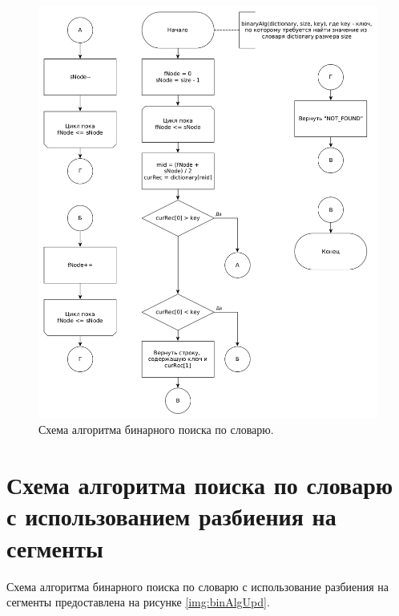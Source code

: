 \documentclass[12pt]{report}
\begin{document}
\begin{figure}
\begin{center}
\includegraphics[scale=0.4]{inc/img/binAlg.png}
\captionsetup{justification=centering}
	\caption{Схема алгоритма бинарного поиска по словарю.}
	\label{img:binAlg}	
\end{center}
\end{figure}

\section{Схема алгоритма поиска по словарю с использованием разбиения на сегменты}
Схема алгоритма бинарного поиска по словарю с использование разбиения на сегменты предоставлена на рисунке \ref{img:binAlgUpd}.
\end{document}
